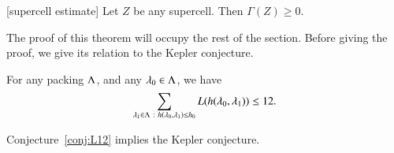 \begin{theorem}[supercell estimate]\label{lemma:superineq} 
Let $Z$ be any supercell.  Then $\Gamma(Z)\ge 0$.
\end{theorem}

The proof of this theorem will occupy the rest of the section.  Before giving the proof, we give its relation to the Kepler conjecture.


\begin{conjecture}\label{conj:L12} For any packing $\Lambda$, and
any $\lambda_0\in\Lambda$, we have
\begin{equation}\label{eqn:L12}
\sum_{\lambda_1\in\Lambda\ :\  h(\lambda_0,\lambda_1)\le {h_0}} L(h(\lambda_0,\lambda_1)) \le 12.
\end{equation}
\end{conjecture}




\begin{theorem}\label{theorem:mk2}
Conjecture~\ref{conj:L12} implies the Kepler conjecture.
\end{theorem}

